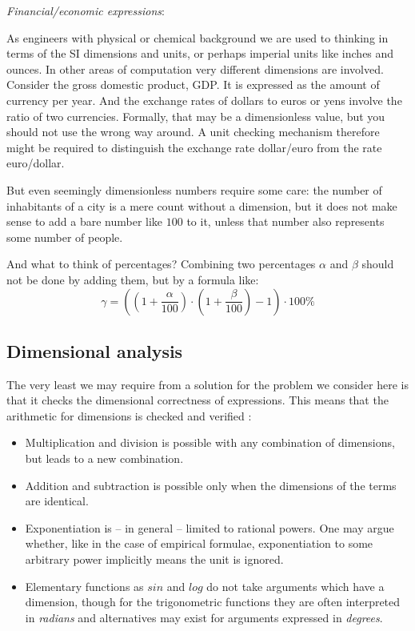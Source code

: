 \documentclass{article}
\begin{document}
\vspace{\baselineskip}
\noindent \emph{Financial/economic expressions}:

\noindent As engineers with physical or chemical background we are used to thinking in terms of the SI dimensions and units, or
perhaps imperial units like inches and ounces. In other areas of computation very different dimensions are involved.
Consider the gross domestic product, GDP. It is expressed as the amount of currency per year. And the
exchange rates of dollars to euros or yens involve the ratio of two currencies. Formally, that may be a dimensionless
value, but you should not use the wrong way around. A unit checking mechanism therefore might be required to
distinguish the exchange rate dollar/euro from the rate euro/dollar.

But even seemingly dimensionless numbers require some care: the number of inhabitants of a city is a mere count without
a dimension, but it does not make sense to add a bare number like $100$ to it, unless that number also represents some
number of people.

And what to think of percentages? Combining two percentages $\alpha$ and $\beta$ should not be done by adding them, but by
a formula like:
\begin{equation}
    \gamma = ((1 + \frac{\alpha}{100}) \cdot (1 + \frac{\beta}{100}) - 1) \cdot 100\%
\end{equation}

\subsection*{Dimensional analysis}

The very least we may require from a solution for the problem we consider here is that it checks the dimensional correctness
of expressions. This means that the arithmetic for dimensions is checked and verified \cite{DimensionalAnalysis}:
\begin{itemize}
\item
Multiplication and division is possible with any combination of dimensions, but leads to a new combination.
\item
Addition and subtraction is possible only when the dimensions of the terms are identical.
\item
Exponentiation is -- in general -- limited to rational powers. One may argue whether, like in the case of empirical
formulae, exponentiation to some arbitrary power implicitly means the unit is ignored.
\item
Elementary functions as $sin$ and $log$ do not take arguments which have a dimension, though for the trigonometric functions
they are often interpreted in \emph{radians} and alternatives may exist for arguments expressed in \emph{degrees}.
\end{itemize}
\end{document}
